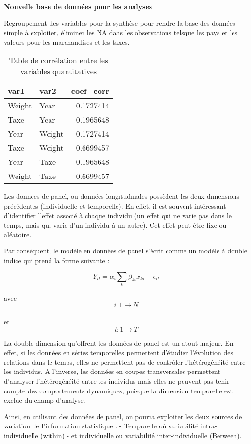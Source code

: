 \documentclass[
]{book}
\begin{document}
\textbf{Nouvelle base de données pour les analyses}

Regroupement des variables pour la synthèse pour rendre la base des données simple à exploiter, éliminer les NA dans les observations telsque les pays et les valeurs pour les marchandises et les taxes.

\begin{table}

\caption{\label{tab:unnamed-chunk-40}Table de corrélation entre les variables quantitatives}
\centering
\begin{tabular}[t]{l|l|r}
\hline
var1 & var2 & coef\_corr\\
\hline
Weight & Year & -0.1727414\\
\hline
Taxe & Year & -0.1965648\\
\hline
Year & Weight & -0.1727414\\
\hline
Taxe & Weight & 0.6699457\\
\hline
Year & Taxe & -0.1965648\\
\hline
Weight & Taxe & 0.6699457\\
\hline
\end{tabular}
\end{table}

Les données de panel, ou données longitudinales possèdent les deux dimensions précédentes (individuelle et temporelle). En effet, il est souvent intéressant d'identifier l'effet associé à chaque individu (un effet qui ne varie pas dans le temps, mais qui varie d'un individu à un autre). Cet effet peut être fixe ou aléatoire.

Par conséquent, le modèle en données de panel s'écrit comme un modèle à double indice qui prend la forme suivante :

\[ Y_{it}= \alpha_i\sum_{k}\beta_{ki}x_{ki}+ \epsilon_{it} \]

avec
\[ i:1 \rightarrow N \]\\
et
\[ t:1 \rightarrow T \]

La double dimension qu'offrent les données de panel est un atout majeur. En effet, si les données en séries temporelles permettent d'étudier l'évolution des relations dans le temps, elles ne permettent pas de contrôler l'hétérogénéité entre les individus. A l'inverse, les données en coupes transversales permettent d'analyser l'hétérogénéité entre les individus mais elles ne peuvent pas tenir compte des comportements dynamiques, puisque la dimension temporelle est exclue du champ d'analyse.

Ainsi, en utilisant des données de panel, on pourra exploiter les deux sources de variation de l'information statistique :
- Temporelle où variabilité intra-individuelle (within)
- et individuelle ou variabilité inter-individuelle (Between).
\end{document}
